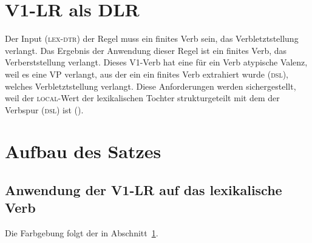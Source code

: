 \documentclass[10pt,a3paper]{article}
\newcommand{\rot}[1]{\textcolor{rot}{#1}}
\newcommand{\blau}[1]{\textcolor{blau}{#1}}
\newcommand{\gruen}[1]{\textcolor{gruen}{#1}}
\newcommand{\orongsch}[1]{\textcolor{orongsch}{#1}}
\newcommand{\tuerkis}[1]{\textcolor{tuerkis}{#1}}
\newcommand*{\mybox}[1]{\framebox{#1}}
\newcommand{\Zeile}{\vspace{\baselineskip}}
\begin{document}
\section{V1-LR als DLR}\label{sec:v1lr}


\Zeile

Der Input (\textsc{lex-dtr}) der Regel muss ein \blau{finites Verb} sein, das \orongsch{Verbletztstellung} verlangt.
Das Ergebnis der Anwendung dieser Regel ist ein \tuerkis{finites Verb}, das \rot{Verberststellung} verlangt.
Dieses V1-Verb hat eine für ein Verb atypische \gruen{Valenz}, weil es eine \gruen{VP} verlangt, aus der ein \blau{ein finites Verb} extrahiert wurde (\textsc{\blau{dsl}}), welches \orongsch{Verbletztstellung} verlangt.
Diese Anforderungen werden sichergestellt, weil der \blau{\textsc{local}}-Wert der lexikalischen Tochter strukturgeteilt mit dem der \blau{Verbspur (\textsc{dsl})} ist (\blau{\mybox{1}}).

\newpage

\section{Aufbau des Satzes}

\subsection{Anwendung der V1-LR auf das lexikalische Verb}

Die Farbgebung folgt der in Abschnitt~\ref{sec:v1lr}.
\end{document}
